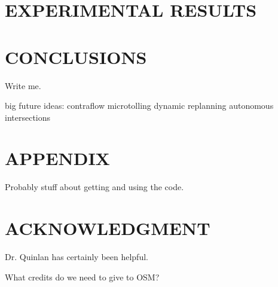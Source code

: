 \documentclass[letterpaper, 10 pt, conference]{ieeeconf}  %
\begin{document}



\section{EXPERIMENTAL RESULTS}



\section{CONCLUSIONS}

Write me.

big future ideas:
  contraflow
  microtolling
  dynamic replanning
    autonomous intersections

\addtolength{\textheight}{-12cm}  %


\section*{APPENDIX}

Probably stuff about getting and using the code.

\section*{ACKNOWLEDGMENT}

Dr. Quinlan has certainly been helpful.

What credits do we need to give to OSM?








\end{document}
